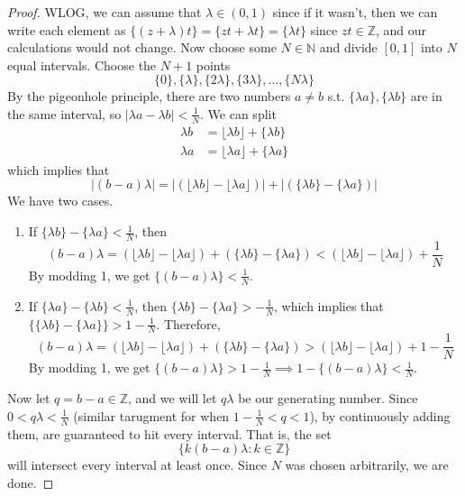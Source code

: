 	\begin{proof}
		WLOG, we can assume that $\lambda \in (0, 1)$ since if it wasn't, then we can write each element as $\{(z + \lambda)t\} = \{zt + \lambda t\} = \{\lambda t\}$ since $zt \in \mathbb{Z}$, and our calculations would not change. Now choose some $N \in \mathbb{N}$ and divide $[0, 1]$ into $N$ equal intervals. Choose the $N + 1$ points 
		\begin{equation}
			\{0\}, \{\lambda\}, \{2 \lambda\}, \{3 \lambda\}, \ldots, \{N \lambda\} 
		\end{equation}
		By the pigeonhole principle, there are two numbers $a \neq b$ s.t. $\{\lambda a\}, \{\lambda b\}$ are in the same interval, so $|\lambda a - \lambda b| < \frac{1}{N}$. We can split 
		\begin{align}
			\lambda b & = \lfloor \lambda b \rfloor + \{ \lambda b \} \\ 
			\lambda a & = \lfloor \lambda a \rfloor + \{ \lambda a \} 
		\end{align} 
		which implies that 
		\begin{equation}
			|(b - a) \lambda| = |( \lfloor \lambda b \rfloor - \lfloor \lambda a \rfloor )| + |( \{\lambda b\} - \{ \lambda a\} )|
		\end{equation} 
		We have two cases. 
		\begin{enumerate}
			\item If $\{\lambda b \} - \{\lambda a\} < \frac{1}{N}$, then 
				\begin{equation}
					(b - a) \lambda = (\lfloor \lambda b \rfloor - \lfloor \lambda a \rfloor) + (\{\lambda b \} - \{\lambda a\}) < (\lfloor \lambda b \rfloor - \lfloor \lambda a \rfloor) + \frac{1}{N}
				\end{equation}
				By modding 1, we get $\{(b - a) \lambda\} < \frac{1}{N}$. 

			\item If $\{\lambda a\} - \{\lambda b\} < \frac{1}{N}$, then $\{\lambda b\} - \{\lambda a\} > - \frac{1}{N}$, which implies that $\{ \{\lambda b\} - \{\lambda a\} \} > 1 - \frac{1}{N}$. Therefore, 
				\begin{equation}
					(b - a) \lambda = (\lfloor \lambda b \rfloor - \lfloor \lambda a \rfloor) + (\{\lambda b \} - \{\lambda a\}) > (\lfloor \lambda b \rfloor - \lfloor \lambda a \rfloor) + 1 - \frac{1}{N}
				\end{equation}
				By modding 1, we get $\{(b - a) \lambda\} > 1 - \frac{1}{N} \implies 1 - \{(b - a) \lambda\} < \frac{1}{N}$. 
		\end{enumerate} 
		Now let $q = b - a \in \mathbb{Z}$, and we will let $q\lambda$ be our generating number. Since $0 < q \lambda < \frac{1}{N}$ (similar tarugment for when $1 - \frac{1}{N} < q < 1$), by continuously adding them, are guaranteed to hit every interval. That is, the set 
		\begin{equation}
			\{k (b - a) \lambda \colon k \in \mathbb{Z}\}
		\end{equation} 
		will intersect every interval at least once. Since $N$ was chosen arbitrarily, we are done.  
	\end{proof}


